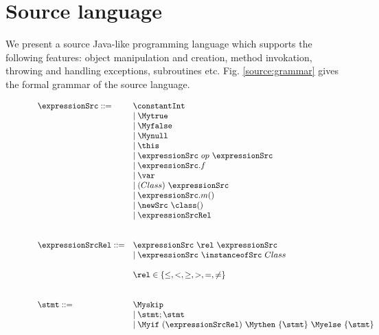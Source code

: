 
\newtheorem{Expression}{Definition}[section]
\newtheorem{ExpressionRel}[Expression]{Definition}
\newtheorem{Statement}[Expression]{Definition}

\section{Source language} \label{source}


We present a source Java-like programming language which supports the following features:
object manipulation and creation, method invokation, throwing and handling exceptions, subroutines etc. Fig. \ref{source:grammar} gives the formal grammar of the source language.
\begin{figure}[ht!] 
\begin{frameit}
   $$ \begin{array} {ll}    
     \expressionSrc ::=         & \constantInt  \\
				& \mid \Mytrue \\ 
				& \mid \Myfalse \\
				& \mid \Mynull  \\
				& \mid \this \\
				& \mid \expressionSrc \ op \ \expressionSrc \\  
				& \mid \expressionSrc.f \\
				& \mid \var \\
  			        & \mid (Class) \ \expressionSrc \\
				& \mid \expressionSrc.m() \\
				& \mid  \newSrc \ \class  ( ) \\
				& \mid \expressionSrcRel \\
                                & \\
				& \\
     \expressionSrcRel ::=      & \expressionSrc \ \rel \ \expressionSrc \\
				& \mid \expressionSrc \ \instanceofSrc \ Class\\
				& \\   
				& \rel \in \{ \le, < ,  \ge, >, = , \neq \}      \\
				& \\
				& \\
      \stmt ::=		        & \Myskip \\
                                & \mid \stmt;\stmt \\
                                & \mid \Myif \ (\expressionSrcRel) \ \Mythen \ \{ \stmt \} \  \Myelse \ \{ \stmt \}  \\

\end{array}$$
\end{frameit}
\end{figure}
